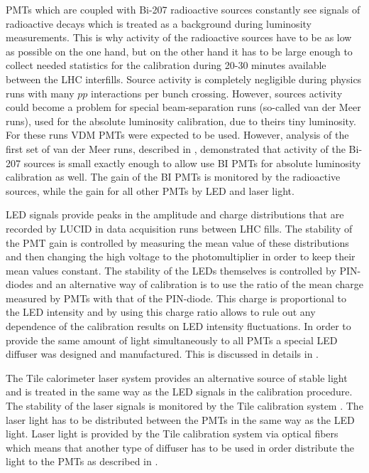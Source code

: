 PMTs which are coupled with Bi-207 radioactive sources constantly see signals of radioactive decays which is treated as a background
during luminosity measurements. This is why activity of the radioactive sources have to be as low as possible on the one hand, 
but on the other hand it has to be large enough to collect needed statistics for the calibration during 20-30 minutes available between the LHC interfills.
Source activity is completely negligible during physics runs with many $pp$ interactions per bunch crossing. However, sources activity could become 
a problem for special beam-separation runs (so-called van der Meer runs), used for the absolute luminosity calibration, due to theirs tiny luminosity.
For these runs VDM PMTs were expected to be used. However, analysis of the first set of van der Meer runs, described in , 
demonstrated that activity of the Bi-207 sources is small exactly enough to allow use BI PMTs for absolute luminosity calibration as well. 
The gain of the BI PMTs is monitored by the radioactive sources, while the gain for all other PMTs by LED and laser light.

LED signals provide peaks in the amplitude and charge distributions that are recorded by LUCID in data acquisition runs between LHC fills.
The stability of the PMT gain is controlled by measuring the mean value of these distributions 
and then changing the high voltage to the photomultiplier in order to keep their mean values constant. 
The stability of the LEDs themselves is controlled by PIN-diodes and an alternative way of calibration is 
to use the ratio of the mean charge measured by PMTs with that of the PIN-diode. 
This charge is proportional to the LED intensity and by using this charge ratio allows to rule out any 
dependence of the calibration results on LED intensity fluctuations.
In order to provide the same amount of light simultaneously to all PMTs a special LED diffuser was designed and manufactured.
This is discussed in details in .

The Tile calorimeter laser system provides an alternative source of stable light and is treated in the same way
as the LED signals in the calibration procedure. 
The stability of the laser signals is monitored by the Tile calibration system \cite{Aad:2008zzm}.
The laser light has to be distributed between the PMTs in the same way as the LED light.
Laser light is provided by the Tile calibration system via optical fibers which means that another type of diffuser
has to be used in order distribute the light to the PMTs as described in .

